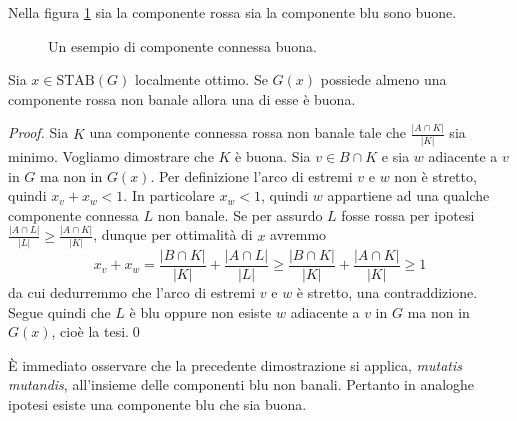 \begin{example}
  Nella figura \ref{goodexample} sia la componente rossa sia la componente blu sono buone. 
  \begin{figure}
    \centering 
    \caption{Un esempio di componente connessa buona.} \label{goodexample} 
  \end{figure}
\end{example}
\begin{lemma}
  \label{goodlemma} Sia \(x\in \text{STAB}(G)\) localmente ottimo. Se \(G(x)\) possiede almeno una componente rossa non banale allora una di esse è buona. 
\end{lemma}
\begin{proof}
  Sia \(K\) una componente connessa rossa non banale tale che \(\frac{|A\cap K|}{|K|}\) sia minimo. Vogliamo dimostrare che \(K\) è buona. Sia \(v\in B\cap K\) e sia \(w\) adiacente a \(v\) in \(G\) ma non in \(G(x)\). Per definizione l'arco di estremi \(v\) e \(w\) non è stretto, quindi \(x_v+x_w<1\). In particolare \(x_w<1\), quindi \(w\) appartiene ad una qualche componente connessa \(L\) non banale. Se per assurdo \(L\) fosse rossa per ipotesi \(\frac{|A\cap L|}{|L|}\ge\frac{|A\cap K|}{|K|}\), dunque per ottimalità di \(x\) avremmo
  \[x_v+x_w=\frac{|B\cap K|}{|K|}+\frac{|A\cap L|}{|L|}\ge\frac{|B\cap K|}{|K|}+\frac{|A\cap K|}{|K|}\ge 1\]
  da cui dedurremmo che l'arco di estremi \(v\) e \(w\) è stretto, una contraddizione. Segue quindi che \(L\) è blu oppure non esiste \(w\) adiacente a \(v\) in \(G\) ma non in \(G(x)\), cioè la tesi.\qed 
\end{proof}
È immediato osservare che la precedente dimostrazione si applica, \emph{mutatis mutandis}, all'insieme delle componenti blu non banali. Pertanto in analoghe ipotesi esiste una componente blu che sia buona. 
